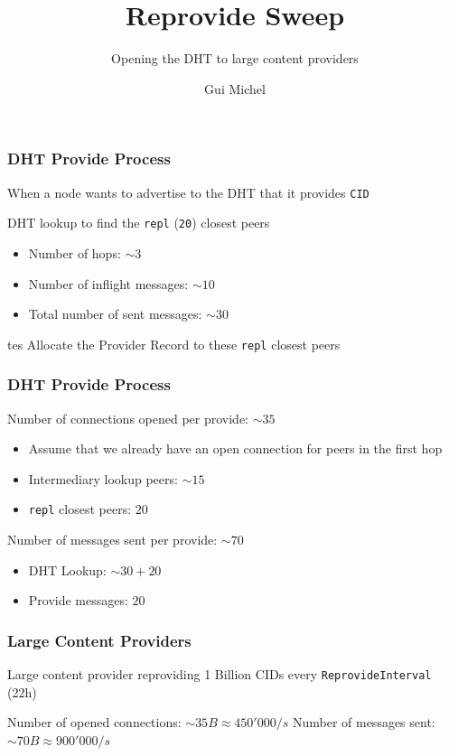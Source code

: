 \documentclass{../pl-slide}
\title{Reprovide Sweep}
\subtitle{Opening the DHT to large content providers}
\author{Gui Michel}
\institute{Protocol Labs}
\date{\DTMdate{2023-04-16}}
\begin{document}
\frame{\titlepage}

\begin{frame}
\frametitle{DHT Provide Process}
When a node wants to advertise to the DHT that it provides \texttt{CID}
\bigskip
\begin{itemize}
        \itemc DHT lookup to find the \texttt{repl} (\texttt{20}) closest peers
        \begin{itemize}
        		\item[\greencube] Number of hops: $\sim 3$
        		\item[\greencube] Number of inflight messages: $\sim 10$
        		\item[\greencube] Total number of sent messages: $\sim 30$
        \end{itemize}
        \bigskip
tes        \itemc Allocate the Provider Record to these \texttt{repl} closest peers

\end{itemize}
\end{frame}

\begin{frame}
\frametitle{DHT Provide Process}

\begin{itemize}
        \itemc Number of connections opened per provide: $\sim 35$
        \begin{itemize}
        		\item[\greencube] Assume that we already have an open connection for peers in the first hop
        		\item[\greencube] Intermediary lookup peers: $\sim 15$
        		\item[\greencube] \texttt{repl} closest peers: $20$
        \end{itemize}
        \bigskip
        \itemc Number of messages sent per provide: $\sim 70$
         \begin{itemize}
        		\item[\greencube] DHT Lookup: $\sim 30 + 20$
        		\item[\greencube] Provide messages: $20$
        \end{itemize}

\end{itemize}
\end{frame}


\begin{frame}
\frametitle{Large Content Providers}

Large content provider reproviding 1 Billion CIDs every \texttt{ReprovideInterval} (22h)
\bigskip
\begin{itemize}
	\itemc Number of opened connections: $\sim 35B \approx 450'000/s$ 
	\itemc Number of messages sent: $\sim 70B \approx 900'000/s$
\end{itemize}
\end{frame}
\end{document}
